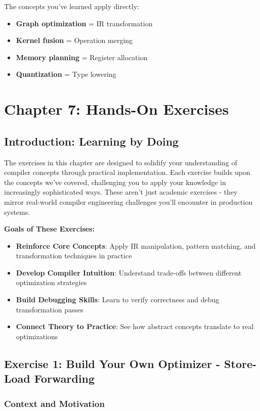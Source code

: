 \documentclass[11pt,a4paper]{article}
\begin{document}
The concepts you've learned apply directly:
\begin{itemize}
    \item \textbf{Graph optimization} = IR transformation
    \item \textbf{Kernel fusion} = Operation merging
    \item \textbf{Memory planning} = Register allocation
    \item \textbf{Quantization} = Type lowering
\end{itemize}

\section{Chapter 7: Hands-On Exercises}

\subsection{Introduction: Learning by Doing}

The exercises in this chapter are designed to solidify your understanding of compiler concepts through practical implementation. Each exercise builds upon the concepts we've covered, challenging you to apply your knowledge in increasingly sophisticated ways. These aren't just academic exercises - they mirror real-world compiler engineering challenges you'll encounter in production systems.

\textbf{Goals of These Exercises:}
\begin{itemize}
    \item \textbf{Reinforce Core Concepts}: Apply IR manipulation, pattern matching, and transformation techniques in practice
    \item \textbf{Develop Compiler Intuition}: Understand trade-offs between different optimization strategies
    \item \textbf{Build Debugging Skills}: Learn to verify correctness and debug transformation passes
    \item \textbf{Connect Theory to Practice}: See how abstract concepts translate to real optimizations
\end{itemize}

\subsection{Exercise 1: Build Your Own Optimizer - Store-Load Forwarding}

\subsubsection{Context and Motivation}
\end{document}
